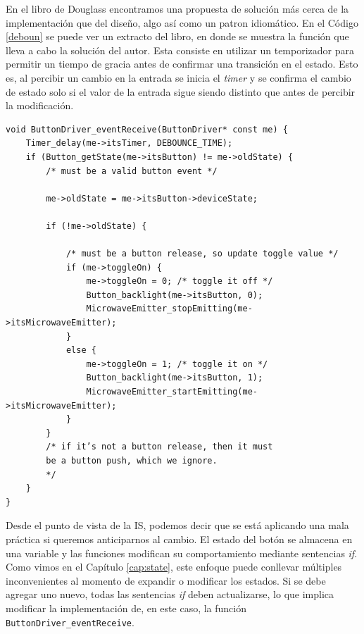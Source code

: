 En el libro de Douglass \cite{douglass} encontramos una propuesta de solución más cerca de la implementación que del diseño, algo así como un patron idiomático. En el Código \ref{deboun} se puede ver un extracto del libro, en donde se muestra la función que lleva a cabo la solución del autor. Esta consiste en utilizar un temporizador para permitir un tiempo de gracia antes de confirmar una transición en el estado. Esto es, al percibir un cambio en la entrada se inicia el \textit{timer} y se confirma el cambio de estado solo si el valor de la entrada sigue siendo distinto que antes de percibir la modificación. 

\begin{lstlisting}[caption=Código ejemplo de una estrategia de deteccion de rebote extraído de \cite{douglass}.,label=deboun]
void ButtonDriver_eventReceive(ButtonDriver* const me) {
    Timer_delay(me->itsTimer, DEBOUNCE_TIME);
    if (Button_getState(me->itsButton) != me->oldState) {
        /* must be a valid button event */
        
        me->oldState = me->itsButton->deviceState;
        
        if (!me->oldState) {
            
            /* must be a button release, so update toggle value */
            if (me->toggleOn) {
                me->toggleOn = 0; /* toggle it off */
                Button_backlight(me->itsButton, 0);
                MicrowaveEmitter_stopEmitting(me->itsMicrowaveEmitter);
            }
            else {
                me->toggleOn = 1; /* toggle it on */
                Button_backlight(me->itsButton, 1);
                MicrowaveEmitter_startEmitting(me->itsMicrowaveEmitter);
            }
        }
        /* if it’s not a button release, then it must
        be a button push, which we ignore.
        */
    }
}
\end{lstlisting}

Desde el punto de vista de la \gls{IS}, podemos decir que se está aplicando una mala práctica si queremos anticiparnos al cambio. El estado del botón se almacena en una variable y las funciones modifican su comportamiento mediante sentencias \textit{if}. Como vimos en el Capítulo \ref{cap:state}, este enfoque puede conllevar múltiples inconvenientes al momento de expandir o modificar los estados. Si se debe agregar uno nuevo, todas las sentencias \textit{if} deben actualizarse, lo que implica modificar la implementación de, en este caso, la función \verb|ButtonDriver_eventReceive|.

